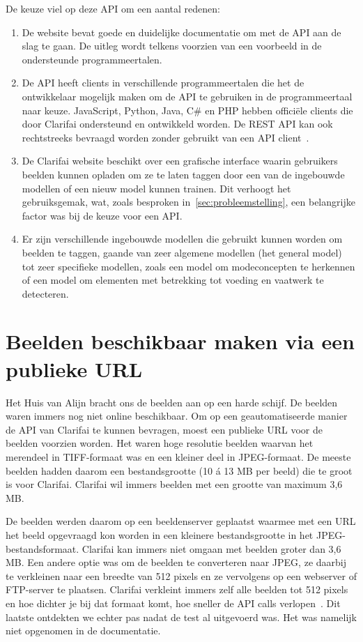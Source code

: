 De keuze viel op deze API om een aantal redenen:
\begin{enumerate}
	\item De website bevat goede en duidelijke documentatie om met de API aan de slag te gaan. De uitleg wordt telkens voorzien van een voorbeeld in de ondersteunde programmeertalen.
	\item De API heeft clients in verschillende programmeertalen die het de ontwikkelaar mogelijk maken om de API te gebruiken in de programmeertaal naar keuze. JavaScript, Python, Java, C\# en PHP hebben officiële clients die door Clarifai ondersteund en ontwikkeld worden. De REST API kan ook rechtstreeks bevraagd worden zonder gebruikt van een API client~\autocite{ClarifaiAPI}.
	\item De Clarifai website beschikt over een grafische interface waarin gebruikers beelden kunnen opladen om ze te laten taggen door een van de ingebouwde modellen of een nieuw model kunnen trainen. Dit verhoogt het gebruiksgemak, wat, zoals besproken in~\ref{sec:probleemstelling}, een belangrijke factor was bij de keuze voor een API.
	\item Er zijn verschillende ingebouwde modellen die gebruikt kunnen worden om beelden te taggen, gaande van zeer algemene modellen (het general model) tot zeer specifieke modellen, zoals een model om modeconcepten te herkennen of een model om elementen met betrekking tot voeding en vaatwerk te detecteren.
\end{enumerate}

\section{Beelden beschikbaar maken via een publieke URL}
\label{sec:beelden-via-URL}

Het Huis van Alijn bracht ons de beelden aan op een harde schijf. De beelden waren immers nog niet online beschikbaar. Om op een geautomatiseerde manier de API van Clarifai te kunnen bevragen, moest een publieke URL voor de beelden voorzien worden. Het waren hoge resolutie beelden waarvan het merendeel in TIFF-formaat was en een kleiner deel in JPEG-formaat. De meeste beelden hadden daarom een bestandsgrootte (10 \'{a} 13 MB per beeld) die te groot is voor Clarifai. Clarifai wil immers beelden met een grootte van maximum 3,6 MB. 

De beelden werden daarom op een beeldenserver geplaatst waarmee met een URL het beeld opgevraagd kon worden in een kleinere bestandsgrootte in het JPEG-bestandsformaat. Clarifai kan immers niet omgaan met beelden groter dan 3,6 MB. Een andere optie was om de beelden te converteren naar JPEG, ze daarbij te verkleinen naar een breedte van 512 pixels en ze vervolgens op een webserver of FTP-server te plaatsen. Clarifai verkleint immers zelf alle beelden tot 512 pixels en hoe dichter je bij dat formaat komt, hoe sneller de API calls verlopen~\autocite{Clairbot2019}. Dit laatste ontdekten we echter pas nadat de test al uitgevoerd was. Het was namelijk niet opgenomen in de documentatie.

